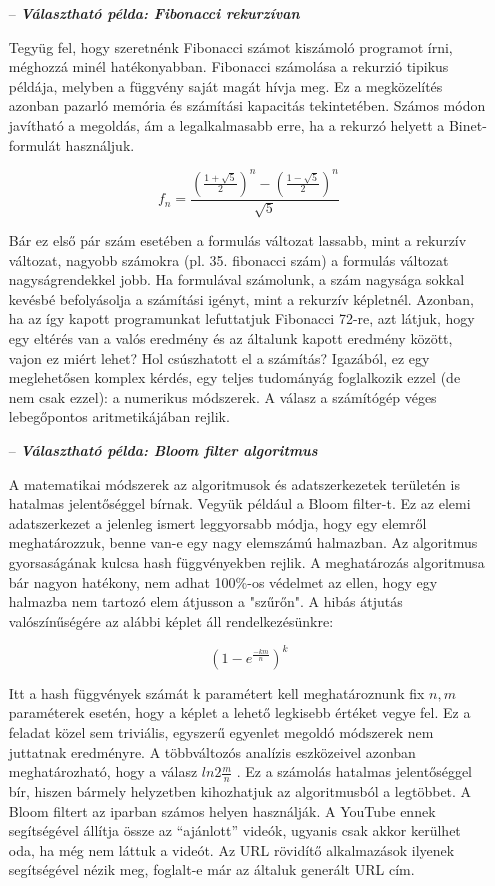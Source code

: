 \documentclass[../Main.tex]{subfiles}
\begin{document}
\begin{itemize}
    \item[--]  \textit{\textbf{{Választható példa: Fibonacci rekurzívan}}}
    
    Tegyüg fel, hogy szeretnénk Fibonacci számot kiszámoló programot írni, méghozzá minél hatékonyabban.
    Fibonacci számolása a rekurzió tipikus példája, melyben a függvény saját magát hívja meg. Ez a
    megközelítés azonban pazarló memória és számítási kapacitás tekintetében. Számos módon
    javítható a megoldás, ám a legalkalmasabb erre, ha a rekurzó helyett a Binet-formulát használjuk.

    \[ 
        f_n = \frac
            {
            (\frac{1 + \sqrt{5}}{2})^n - (\frac{1 - \sqrt{5}}{2})^n
            }
            {
                \sqrt{5}
            }
    \]

    Bár ez első pár szám esetében a formulás változat lassabb, mint a rekurzív változat,
    nagyobb számokra (pl. 35. fibonacci szám) a formulás változat nagyságrendekkel jobb.
    Ha formulával számolunk, a szám nagysága sokkal kevésbé befolyásolja a számítási igényt,
    mint a rekurzív képletnél. Azonban, ha az így kapott programunkat lefuttatjuk Fibonacci 72-re,
    azt látjuk, hogy egy eltérés van a valós eredmény és az általunk kapott eredmény között,
    vajon ez miért lehet? Hol csúszhatott el a számítás? Igazából, ez egy meglehetősen komplex kérdés,
    egy teljes tudományág foglalkozik ezzel (de nem csak ezzel): a numerikus módszerek.
    A válasz a számítógép véges lebegőpontos aritmetikájában rejlik.

    \item[--]  \textit{\textbf{Választható példa: Bloom filter algoritmus}}
     
        A matematikai módszerek az algoritmusok és adatszerkezetek területén is hatalmas jelentőséggel
        bírnak. Vegyük például a Bloom filter-t. Ez az elemi adatszerkezet a jelenleg ismert leggyorsabb
        módja, hogy egy elemről meghatározzuk, benne van-e egy nagy elemszámú halmazban. Az
        algoritmus gyorsaságának kulcsa hash függvényekben rejlik. A meghatározás algoritmusa bár
        nagyon hatékony, nem adhat 100\%-os védelmet az ellen, hogy egy halmazba nem tartozó elem
        átjusson a "szűrőn". A hibás átjutás valószínűségére az alábbi képlet áll rendelkezésünkre:

        \[
            (1 - e^{\frac{-km}{n}}) ^ k
        \]

        Itt a hash függvények számát k paramétert kell meghatároznunk fix \( n, m \) paraméterek esetén,
        hogy a képlet a lehető legkisebb értéket vegye fel. Ez a feladat közel sem triviális,
        egyszerű egyenlet megoldó módszerek nem juttatnak eredményre. A többváltozós analízis eszközeivel azonban meghatározható,
        hogy a válasz \( ln2 \frac{m}{n}\) . Ez a számolás hatalmas jelentőséggel bír, hiszen bármely helyzetben kihozhatjuk az algoritmusból a legtöbbet.
        A Bloom filtert az iparban számos helyen használják. A YouTube ennek segítségével állítja össze az “ajánlott” videók,
        ugyanis csak akkor kerülhet oda, ha még nem láttuk a videót. Az URL rövidítő alkalmazások ilyenek segítségével nézik meg,
        foglalt-e már az általuk generált URL cím.
        
\end{itemize}
\end{document}

